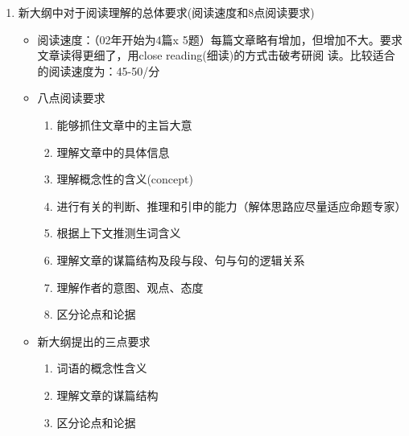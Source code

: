 \documentclass[11pt,twoside,openany,x11names,svgnames]{memoir}
\newcommand{\hei}{\CJKfamily{hei}}      %
\begin{document}
\begin{enumerate}
\begin{itemize}
\begin{enumerate}[(3)]
\textcolor{blue}{包括：}文学、历史、哲学（还剩4篇）
\textcolor{blue}{分析：}88--99年，11年中从未出过题。
\begin{itemize}
  \item 00年（3）文学评论—未来主义诗歌
  \item 00（5）散文—雄心壮志
  \item 01年（5）散文—我这个人的一段心路历程
  \item 02年（1）讲幽默，题目有迷惑性
\end{itemize}
{\hei 总结}：人文科学出题有抬头趋势。
\end{enumerate}
\item 从体裁角度把44篇文章分类：议论文、说明文、记叙文、应用文。
多读：议论文、说明文。  （从来没有出现过记叙文，应用文只出过1篇）
\item 从语言上，以美国英语为主。突显美国英语与美国文化，应该多了解一些美国的基本概况。最好有一幅美国地图。
\end{itemize}
\item 新大纲中对于阅读理解的总体要求(阅读速度和8点阅读要求)
\begin{itemize}
  \item 阅读速度：（02年开始为4篇x 5题）每篇文章略有增加，但增加不大。要求文章读得更细了，用close reading(细读)的方式击破考研阅
读。比较适合的阅读速度为：45-50/分
  \item 八点阅读要求
  \begin{enumerate}[(1)]
  \item 能够抓住文章中的主旨大意
  \item 理解文章中的具体信息
  \item 理解概念性的含义(concept)
  \item 进行有关的判断、推理和引申的能力（解体思路应尽量适应命题专家）
  \item 根据上下文推测生词含义
  \item 理解文章的谋篇结构及段与段、句与句的逻辑关系
  \item 理解作者的意图、观点、态度
  \item 区分论点和论据
\end{enumerate}
  \item 新大纲提出的三点要求
  \begin{enumerate}[(1)]
  \item 词语的概念性含义
  \item 理解文章的谋篇结构
  \item 区分论点和论据
\end{enumerate}
\end{itemize}

\end{enumerate}
\end{document}
